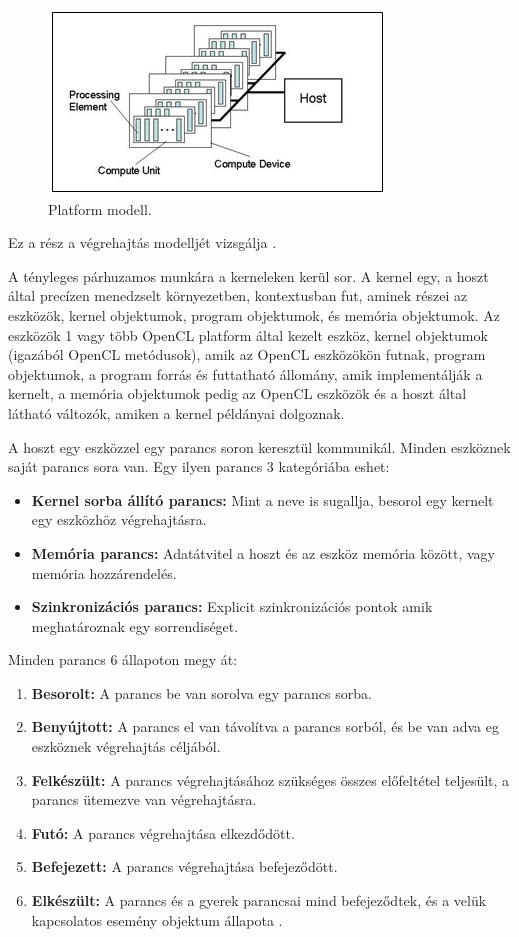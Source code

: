 \begin{figure}[h]
\centering
\includegraphics[scale=1.0]{images/platform_modell.jpg}
\caption{Platform modell. \cite{spec}}
\label{fig:platform_modell}
\end{figure}

Ez a rész a végrehajtás modelljét vizsgálja \cite{spec}.

A tényleges párhuzamos munkára a kerneleken kerül sor. A kernel egy,	 a hoszt által precízen menedzselt környezetben, kontextusban fut, aminek részei az eszközök, kernel objektumok, program objektumok, és memória objektumok. Az eszközök 1 vagy több OpenCL platform által kezelt eszköz, kernel objektumok (igazából OpenCL metódusok), amik az OpenCL eszközökön futnak, program objektumok, a program forrás és futtatható állomány, amik implementálják a kernelt, a memória objektumok pedig az OpenCL eszközök és a hoszt által látható változók, amiken a kernel példányai dolgoznak.

A hoszt egy eszközzel egy parancs soron keresztül kommunikál. Minden eszköznek saját parancs sora van. Egy ilyen parancs 3 kategóriába eshet:
\begin{itemize}
\item\textbf{Kernel sorba állító parancs:} Mint a neve is sugallja, besorol egy kernelt egy eszközhöz végrehajtásra.
\item\textbf{Memória parancs:} Adatátvitel a hoszt és az eszköz memória között, vagy memória hozzárendelés.
\item\textbf{Szinkronizációs parancs:} Explicit szinkronizációs pontok amik meghatároznak egy sorrendiséget.
\end{itemize}
Minden parancs 6 állapoton megy át:
\begin{enumerate}
\item\textbf{Besorolt:} A parancs be van sorolva egy parancs sorba.
\item\textbf{Benyújtott:} A parancs el van távolítva a parancs sorból, és be van adva eg eszköznek végrehajtás céljából.
\item\textbf{Felkészült:} A parancs végrehajtásához szükséges összes előfeltétel teljesült, a parancs ütemezve van végrehajtásra.
\item\textbf{Futó:} A parancs végrehajtása elkezdődött.
\item\textbf{Befejezett:} A parancs végrehajtása befejeződött.
\item\textbf{Elkészült:} A parancs és a gyerek parancsai mind befejeződtek, és a velük kapcsolatos esemény objektum állapota .
\end{enumerate}

